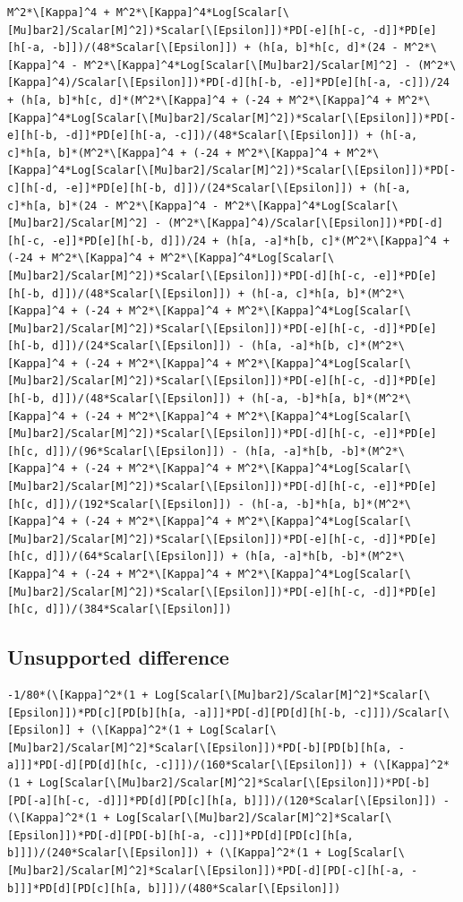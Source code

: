 \documentclass[11pt]{article}
\begin{document}
\begin{verbatim}
M^2*\[Kappa]^4 + M^2*\[Kappa]^4*Log[Scalar[\[Mu]bar2]/Scalar[M]^2])*Scalar[\[Epsilon]])*PD[-e][h[-c, -d]]*PD[e][h[-a, -b]])/(48*Scalar[\[Epsilon]]) + (h[a, b]*h[c, d]*(24 - M^2*\[Kappa]^4 - M^2*\[Kappa]^4*Log[Scalar[\[Mu]bar2]/Scalar[M]^2] - (M^2*\[Kappa]^4)/Scalar[\[Epsilon]])*PD[-d][h[-b, -e]]*PD[e][h[-a, -c]])/24 + (h[a, b]*h[c, d]*(M^2*\[Kappa]^4 + (-24 + M^2*\[Kappa]^4 + M^2*\[Kappa]^4*Log[Scalar[\[Mu]bar2]/Scalar[M]^2])*Scalar[\[Epsilon]])*PD[-e][h[-b, -d]]*PD[e][h[-a, -c]])/(48*Scalar[\[Epsilon]]) + (h[-a, c]*h[a, b]*(M^2*\[Kappa]^4 + (-24 + M^2*\[Kappa]^4 + M^2*\[Kappa]^4*Log[Scalar[\[Mu]bar2]/Scalar[M]^2])*Scalar[\[Epsilon]])*PD[-c][h[-d, -e]]*PD[e][h[-b, d]])/(24*Scalar[\[Epsilon]]) + (h[-a, c]*h[a, b]*(24 - M^2*\[Kappa]^4 - M^2*\[Kappa]^4*Log[Scalar[\[Mu]bar2]/Scalar[M]^2] - (M^2*\[Kappa]^4)/Scalar[\[Epsilon]])*PD[-d][h[-c, -e]]*PD[e][h[-b, d]])/24 + (h[a, -a]*h[b, c]*(M^2*\[Kappa]^4 + (-24 + M^2*\[Kappa]^4 + M^2*\[Kappa]^4*Log[Scalar[\[Mu]bar2]/Scalar[M]^2])*Scalar[\[Epsilon]])*PD[-d][h[-c, -e]]*PD[e][h[-b, d]])/(48*Scalar[\[Epsilon]]) + (h[-a, c]*h[a, b]*(M^2*\[Kappa]^4 + (-24 + M^2*\[Kappa]^4 + M^2*\[Kappa]^4*Log[Scalar[\[Mu]bar2]/Scalar[M]^2])*Scalar[\[Epsilon]])*PD[-e][h[-c, -d]]*PD[e][h[-b, d]])/(24*Scalar[\[Epsilon]]) - (h[a, -a]*h[b, c]*(M^2*\[Kappa]^4 + (-24 + M^2*\[Kappa]^4 + M^2*\[Kappa]^4*Log[Scalar[\[Mu]bar2]/Scalar[M]^2])*Scalar[\[Epsilon]])*PD[-e][h[-c, -d]]*PD[e][h[-b, d]])/(48*Scalar[\[Epsilon]]) + (h[-a, -b]*h[a, b]*(M^2*\[Kappa]^4 + (-24 + M^2*\[Kappa]^4 + M^2*\[Kappa]^4*Log[Scalar[\[Mu]bar2]/Scalar[M]^2])*Scalar[\[Epsilon]])*PD[-d][h[-c, -e]]*PD[e][h[c, d]])/(96*Scalar[\[Epsilon]]) - (h[a, -a]*h[b, -b]*(M^2*\[Kappa]^4 + (-24 + M^2*\[Kappa]^4 + M^2*\[Kappa]^4*Log[Scalar[\[Mu]bar2]/Scalar[M]^2])*Scalar[\[Epsilon]])*PD[-d][h[-c, -e]]*PD[e][h[c, d]])/(192*Scalar[\[Epsilon]]) - (h[-a, -b]*h[a, b]*(M^2*\[Kappa]^4 + (-24 + M^2*\[Kappa]^4 + M^2*\[Kappa]^4*Log[Scalar[\[Mu]bar2]/Scalar[M]^2])*Scalar[\[Epsilon]])*PD[-e][h[-c, -d]]*PD[e][h[c, d]])/(64*Scalar[\[Epsilon]]) + (h[a, -a]*h[b, -b]*(M^2*\[Kappa]^4 + (-24 + M^2*\[Kappa]^4 + M^2*\[Kappa]^4*Log[Scalar[\[Mu]bar2]/Scalar[M]^2])*Scalar[\[Epsilon]])*PD[-e][h[-c, -d]]*PD[e][h[c, d]])/(384*Scalar[\[Epsilon]])
\end{verbatim}
\subsection{Unsupported difference}
\begin{verbatim}
-1/80*(\[Kappa]^2*(1 + Log[Scalar[\[Mu]bar2]/Scalar[M]^2]*Scalar[\[Epsilon]])*PD[c][PD[b][h[a, -a]]]*PD[-d][PD[d][h[-b, -c]]])/Scalar[\[Epsilon]] + (\[Kappa]^2*(1 + Log[Scalar[\[Mu]bar2]/Scalar[M]^2]*Scalar[\[Epsilon]])*PD[-b][PD[b][h[a, -a]]]*PD[-d][PD[d][h[c, -c]]])/(160*Scalar[\[Epsilon]]) + (\[Kappa]^2*(1 + Log[Scalar[\[Mu]bar2]/Scalar[M]^2]*Scalar[\[Epsilon]])*PD[-b][PD[-a][h[-c, -d]]]*PD[d][PD[c][h[a, b]]])/(120*Scalar[\[Epsilon]]) - (\[Kappa]^2*(1 + Log[Scalar[\[Mu]bar2]/Scalar[M]^2]*Scalar[\[Epsilon]])*PD[-d][PD[-b][h[-a, -c]]]*PD[d][PD[c][h[a, b]]])/(240*Scalar[\[Epsilon]]) + (\[Kappa]^2*(1 + Log[Scalar[\[Mu]bar2]/Scalar[M]^2]*Scalar[\[Epsilon]])*PD[-d][PD[-c][h[-a, -b]]]*PD[d][PD[c][h[a, b]]])/(480*Scalar[\[Epsilon]])
\end{verbatim}
\end{document}
